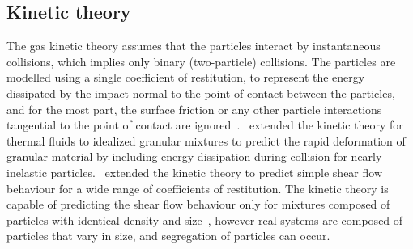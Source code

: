 \subsection{Kinetic theory}
The gas kinetic theory assumes that the particles interact by instantaneous 
collisions, which implies only binary (two-particle) collisions. The particles 
are modelled using a single coefficient of restitution, to represent the energy 
dissipated by the impact normal to the point of contact between the particles, 
and for the most part, the surface friction or any other particle interactions 
tangential to the point of contact are 
ignored~\citep{Campbell1990}.~\citet{Jenkins1983} extended the kinetic theory 
for thermal fluids to idealized granular mixtures to predict the rapid 
deformation of granular material by including energy dissipation during 
collision for nearly inelastic particles.~\citet{Savage1981} extended the 
kinetic theory to predict simple shear flow behaviour for a wide range of 
coefficients of restitution. The kinetic theory is capable of predicting the 
shear flow behaviour only for mixtures composed of particles with identical 
density and size~\citep{Iddir2005}, however real systems are composed of 
particles that vary in size, and segregation of particles can occur. 

